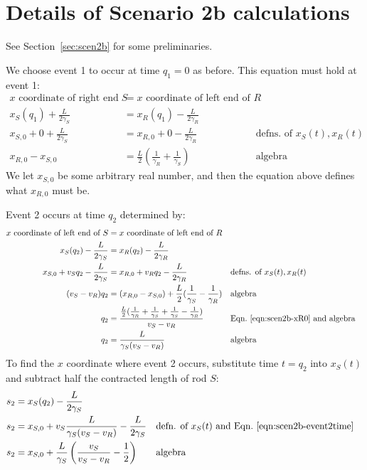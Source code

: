 \documentclass[a4paper]{article}
\theoremstyle{plain}
\theoremstyle{definition}
\begin{document}
\section{Details of Scenario 2b calculations}
\label{app:scen2b}

See Section~\ref{sec:scen2b} for some preliminaries.

We choose event 1 to occur at time $q_1=0$ as before.
This equation must hold at event 1:
\begin{align}
\text{$x$ coordinate of right end of $S$} & = \text{$x$ coordinate of left end of $R$} \nonumber \\
x_S(q_1) + \frac{L}{2\gamma_S} & = x_R(q_1) - \frac{L}{2\gamma_R} \nonumber \\
x_{S,0} + 0 + \frac{L}{2\gamma_S} & = x_{R,0} + 0 - \frac{L}{2\gamma_R} & & \text{defns. of $x_S(t), x_R(t)$} \nonumber \\
x_{R,0} - x_{S,0} & = \frac{L}{2} ( \frac{1}{\gamma_R} + \frac{1}{\gamma_S} ) & & \text{algebra} \label{eqn:scen2b-xR0}
\end{align}
We let $x_{S,0}$ be some arbitrary real number, and then the equation
above defines what $x_{R,0}$ must be.

Event 2 occurs at time $q_2$ determined by:
\begin{align}
\text{$x$ coordinate of left end of $S$} & = \text{$x$ coordinate of left end of $R$} \nonumber \\
x_S(q_2) - \frac{L}{2\gamma_S} & = x_R(q_2) - \frac{L}{2\gamma_R} \nonumber \\
x_{S,0} + v_S q_2 - \frac{L}{2\gamma_S} & = x_{R,0} + v_R q_2 - \frac{L}{2\gamma_R} & & \text{defns. of $x_S(t), x_R(t)$} \nonumber \\
(v_S - v_R) q_2 & = (x_{R,0} - x_{S,0}) + \frac{L}{2} ( \frac{1}{\gamma_S} - \frac{1}{\gamma_R} ) & & \text{algebra} \nonumber \\
q_2 & = \frac{ \frac{L}{2} ( \frac{1}{\gamma_R} + \frac{1}{\gamma_S} + \frac{1}{\gamma_S} - \frac{1}{\gamma_R})}{v_S - v_R} & & \text{Eqn.~\eqref{eqn:scen2b-xR0} and algebra} \nonumber \\
q_2 & = \frac{L}{\gamma_S(v_S - v_R)} & & \text{algebra} \label{eqn:scen2b-event2time}
\end{align}
To find the $x$ coordinate where event 2 occurs, substitute time $t=q_2$
into $x_S(t)$ and subtract half the contracted length of rod $S$:
\begin{align}
s_2 & = x_S(q_2) - \frac{L}{2\gamma_S} \nonumber \\
s_2 & = x_{S,0} + v_S \frac{L}{\gamma_S(v_S - v_R)} - \frac{L}{2\gamma_S} & & \text{defn. of $x_S(t)$ and Eqn.~\eqref{eqn:scen2b-event2time}} \nonumber \\
s_2 & = x_{S,0} + \frac{L}{\gamma_S} \left( \frac{v_S}{v_S - v_R} - \frac{1}{2} \right) & & \text{algebra} \label{eqn:scen2b-event2xcoord}
\end{align}
\end{document}
